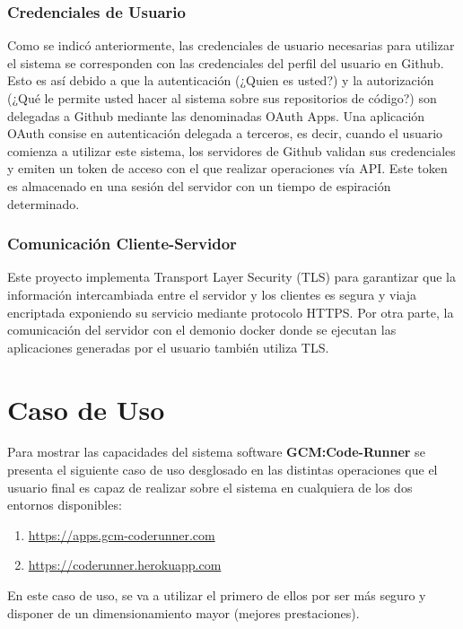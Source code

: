\documentclass[a4paper,11pt]{book}
\begin{document}
\subsubsection{Credenciales de Usuario}

Como se indicó anteriormente, las credenciales de usuario necesarias para utilizar el sistema se corresponden con las credenciales del perfil del usuario en Github. Esto es así debido a que la autenticación (¿Quien es usted?) y la autorización (¿Qué le permite usted hacer al sistema sobre sus repositorios de código?) son delegadas a Github mediante las denominadas OAuth Apps. Una aplicación OAuth consise en autenticación delegada a terceros, es decir, cuando el usuario comienza a utilizar este sistema, los servidores de Github validan sus credenciales y emiten un token de acceso con el que realizar operaciones vía API. Este token es almacenado en una sesión del servidor con un tiempo de espiración determinado. 

\subsubsection{Comunicación Cliente-Servidor}

Este proyecto implementa Transport Layer Security (TLS) para garantizar que la información intercambiada entre el servidor y los clientes es segura y viaja encriptada exponiendo su servicio mediante protocolo HTTPS. Por otra parte, la comunicación del servidor con el demonio docker donde se ejecutan las aplicaciones generadas por el usuario también utiliza TLS.

\section{Caso de Uso}

Para mostrar las capacidades del sistema software \textbf{GCM:Code-Runner} se presenta el siguiente caso de uso desglosado en las distintas operaciones que el usuario final es capaz de realizar sobre el sistema en cualquiera de los dos entornos disponibles:

\begin{enumerate}
\item \url{https://apps.gcm-coderunner.com}
\item \url{https://coderunner.herokuapp.com}
\end{enumerate}

En este caso de uso, se va a utilizar el primero de ellos por ser más seguro y disponer de un dimensionamiento mayor (mejores prestaciones).
\end{document}
